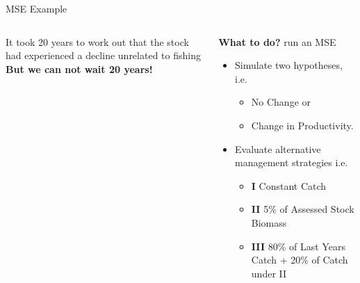 \begin{frame}{MSE Example}
     \begin{columns}[t] 
     \begin{column}[T]{5cm} 
        \smallskip It took 20 years to work out that the stock had experienced a decline unrelated to fishing\smallskip\\
     \textbf{{\color{red} But we can not wait 20 years!}}
     \end{column}
     \begin{column}[T]{5cm}
      \smallskip\textbf{What to do?} run an MSE\smallskip\\
       \Fontviii
       \begin{itemize}[<+->]
          \item Simulate two hypotheses, i.e.
          \begin{itemize}
	    \Fontvi
            \item No Change  or 
	    \item Change in Productivity.
          \end{itemize}
          \item Evaluate alternative management strategies i.e.
          \begin{itemize}
	    \Fontvi
	    \item \textbf{I} Constant Catch
	    \item \textbf{II} 5\% of Assessed Stock Biomass
	    \item \textbf{III} 80\% of Last Years Catch + 20\% of Catch under II
	  \end{itemize}
       \end{itemize}
     \end{column}
    \end{columns}    
\end{frame}

